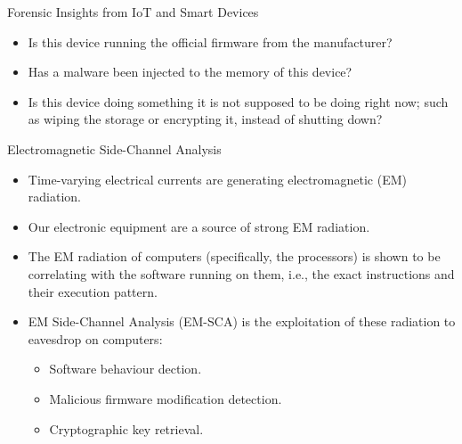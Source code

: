\documentclass[handout]{beamer}
\begin{document}
\begin{frame}{Forensic Insights from IoT and Smart Devices}  

	\begin{itemize}
	\footnotesize
	\item Is this device running the official firmware from the manufacturer?
		\vspace{10pt}
	\item Has a malware been injected to the memory of this device?
		\vspace{10pt}
	\item Is this device doing something it is not supposed to be doing right now; such as wiping the storage or encrypting it, instead of shutting down?
	\end{itemize}

\end{frame}


\begin{frame}{Electromagnetic Side-Channel Analysis}  

	\begin{itemize}
	\footnotesize
	\item Time-varying electrical currents are generating electromagnetic (EM) radiation.
		\vspace{10pt}
	\item Our electronic equipment are a source of strong EM radiation.
		\vspace{10pt}
	\item The EM radiation of computers (specifically, the processors) is shown to be correlating with the software running on them, i.e., the exact instructions and their execution pattern.
		\vspace{10pt}
	\item EM Side-Channel Analysis (EM-SCA) is the exploitation of these radiation to eavesdrop on computers:
		\vspace{5pt}
		\begin{itemize}
		\footnotesize
		\item Software behaviour dection.
		\vspace{10pt}
		\item Malicious firmware modification detection.
		\vspace{10pt}
		\item Cryptographic key retrieval.
		\end{itemize}
	\end{itemize}

\end{frame}
\end{document}
